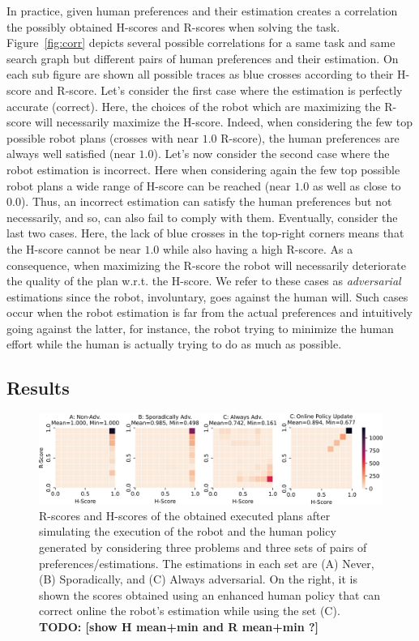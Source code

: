 In practice, given human preferences and their estimation creates a correlation the possibly obtained H-scores and R-scores when solving the task. Figure~\ref{fig:corr} depicts several possible correlations for a same task and same search graph but different pairs of human preferences and their estimation. On each sub figure are shown all possible traces as blue crosses according to their H-score and R-score. 
Let's consider the first case where the estimation is perfectly accurate (correct). Here, the choices of the robot which are maximizing the R-score will necessarily maximize the H-score. Indeed, when considering the few top possible robot plans (crosses with near $1.0$ R-score), the human preferences are always well satisfied (near $1.0$). 
Let's now consider the second case where the robot estimation is incorrect. Here when considering again the few top possible robot plans a wide range of H-score can be reached (near $1.0$ as well as close to $0.0$). Thus, an incorrect estimation can satisfy the human preferences but not necessarily, and so, can also fail to comply with them.
Eventually, consider the last two cases. Here, the lack of blue crosses in the top-right corners means that the H-score cannot be near $1.0$ while also having a high R-score. As a consequence, when maximizing the R-score the robot will necessarily deteriorate the quality of the plan w.r.t. the H-score. We refer to these cases as \textit{adversarial} estimations since the robot, involuntary, goes against the human will. Such cases occur when the robot estimation is far from the actual preferences and intuitively going against the latter, for instance, the robot trying to minimize the human effort while the human is actually trying to do as much as possible.  

    \subsection{Results}

\begin{figure}
    \centering
    \includegraphics[width=\linewidth]{images/Chapter4/quant_results.png}
    \caption{
    R-scores and H-scores of the obtained executed plans after simulating the execution of the robot and the human policy generated by considering three problems and three sets of pairs of preferences/estimations. 
    The estimations in each set are (A) Never, (B) Sporadically, and (C) Always adversarial. On the right, it is shown the scores obtained using an enhanced human policy that can correct online the robot's estimation while using the set (C). \textbf{TODO: [show H mean+min and R mean+min ?]}
    }    
    \label{fig:heatmaps}
\end{figure}

